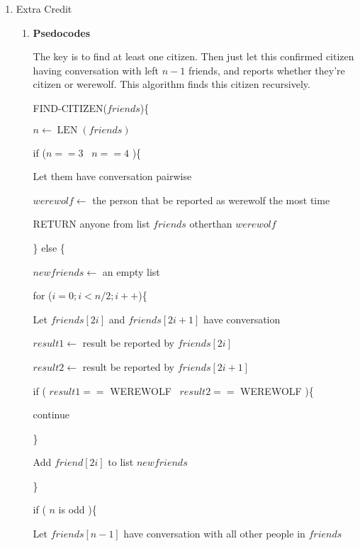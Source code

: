 \documentclass[11pt]{article}
\begin{document}
\begin{enumerate}
\newpage
	\item Extra Credit 
	
		\renewcommand{\theenumii}{\roman{enumii}}
	\begin{enumerate}
		\item \textbf{Psedocodes}
		
		The key is to find at least one citizen. Then just let this confirmed citizen having conversation with left $n-1$ friends, and reports whether they're citizen or werewolf. This algorithm finds this citizen recursively. 
		
		
		FIND-CITIZEN($friends$)\{
		
			\qquad $n \leftarrow \operatorname{LEN}(friends)$
		
			\qquad if ($n == 3$ \textbar\textbar\ $n == 4$ )\{
			
				\qquad\qquad Let them have conversation pairwise
				
				\qquad\qquad $werewolf \leftarrow$ the person that be reported as werewolf the most time
				
				\qquad\qquad RETURN anyone from list $friends$ otherthan $werewolf$
								
			\qquad\} else \{
			
				\qquad\qquad $newfriends \leftarrow$  an empty list
			
				\qquad\qquad  for ($i=0;i<n/2;i++$)\{
					
					\qquad\qquad\qquad Let $friends\left[2i\right]$ and $friends\left[2i+1\right]$ have conversation
					
					\qquad\qquad\qquad $result1 \leftarrow$ result be reported by $friends\left[2i\right]$
					
					\qquad\qquad\qquad $result2 \leftarrow$ result be reported by $friends\left[2i+1\right]$
					
					\qquad\qquad\qquad if ( $result1==$ WEREWOLF \textbar\textbar\ $result2==$ WEREWOLF )\{
					
					\qquad\qquad\qquad\qquad continue
					
					\qquad\qquad\qquad \}
					
					\qquad\qquad\qquad Add $friend\left[2i\right]$ to list $newfriends$
				
				\qquad\qquad \}
				
				\qquad\qquad if ( $n$ is odd )\{
				
				\qquad\qquad\qquad Let $friends\left[n-1\right]$ have conversation with all other people in  $friends$
				

\end{enumerate}
\end{enumerate}
\end{document}
